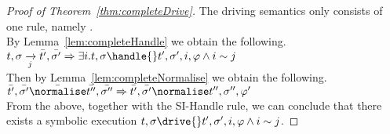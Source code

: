 \begin{proof}[Proof of Theorem~\ref{thm:completeDrive}]
  The driving semantics only consists of one rule, namely .\\
  By Lemma~\ref{lem:completeHandle} we obtain the following.\\
  $t,\sigma\xrightarrow[j]{}\bar{t'},\bar{\sigma'}\implies \exists i . t,\sigma\handle{}t',\sigma',i,\phi \land i\sim j$\\
  Then by Lemma~\ref{lem:completeNormalise} we obtain the following.\\
  $\bar{t'},\bar{\sigma'}\bar{\normalise}\bar{t''},\bar{\sigma''}\implies \bar{t'},\bar{\sigma'}\normalise t'',\sigma'',\phi'$\\
  From the above, together with the SI-Handle rule, we can conclude that there exists a symbolic execution $t,\sigma\drive{} t',\sigma',i,\phi\land i\sim j$.

\end{proof}
